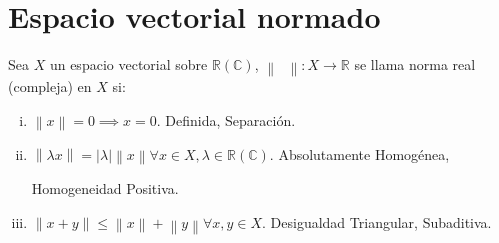 \chapter{Espacio vectorial normado}
\label{intro} %

\begin{definition}
    Sea $X$ un espacio vectorial sobre
    \begin{math}
        \mathbb{R}
        \left(
        \mathbb{C}
        \right)
    \end{math},
    \begin{math}
        \left\|
        \phantom{\cdot}
        \right\|\colon
        X\to
        \mathbb{R}
    \end{math}
    se llama norma real (compleja) en $X$ si:
    \begin{enumerate}[i)]
        \item

              \begin{math}
                  \left\|
                  x
                  \right\|=
                  0\implies
                  x=
                  0
              \end{math}.
              \hfill
              Definida, Separación.

        \item

              \begin{math}
                  \left\|
                  \lambda x
                  \right\|=
                  \left|
                  \lambda
                  \right|
                  \left\|
                  x
                  \right\|
                  \forall x\in X,
                  \lambda\in\mathbb{R}
                  \left(\mathbb{C}\right)
              \end{math}.
              \hfill
              Absolutamente Homogénea,

              \hfill
              Homogeneidad Positiva.

        \item

              \begin{math}
                  \left\|
                  x+y
                  \right\|\leq
                  \left\|
                  x
                  \right\|+
                  \left\|
                  y
                  \right\|
                  \forall x, y\in X
              \end{math}.
              \hfill
              Desigualdad Triangular, Subaditiva.
    \end{enumerate}


\end{definition}
